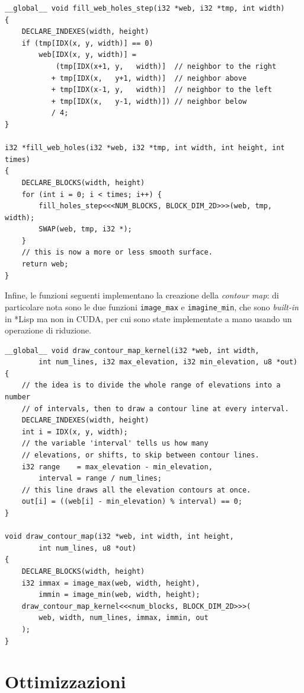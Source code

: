 \documentclass[12pt,a4paper,openright,twoside]{report}
\begin{document}
\begin{lstlisting}[style=mystyle]
__global__ void fill_web_holes_step(i32 *web, i32 *tmp, int width)
{
    DECLARE_INDEXES(width, height)
    if (tmp[IDX(x, y, width)] == 0)
        web[IDX(x, y, width)] =
            (tmp[IDX(x+1, y,   width)]  // neighbor to the right
           + tmp[IDX(x,   y+1, width)]  // neighbor above
           + tmp[IDX(x-1, y,   width)]  // neighbor to the left
           + tmp[IDX(x,   y-1, width)]) // neighbor below
           / 4;
}

i32 *fill_web_holes(i32 *web, i32 *tmp, int width, int height, int times)
{
    DECLARE_BLOCKS(width, height)
    for (int i = 0; i < times; i++) {
        fill_holes_step<<<NUM_BLOCKS, BLOCK_DIM_2D>>>(web, tmp, width);
        SWAP(web, tmp, i32 *);
    }
    // this is now a more or less smooth surface.
    return web;
}
\end{lstlisting}

Infine, le funzioni seguenti implementano la creazione della \textit{contour map}: di particolare nota sono le due funzioni \verb|image_max| e \verb|imagine_min|, che sono \textit{built-in} in *Lisp ma non in CUDA, per cui sono state implementate a mano usando un operazione di riduzione.

\begin{lstlisting}[style=mystyle]
__global__ void draw_contour_map_kernel(i32 *web, int width,
        int num_lines, i32 max_elevation, i32 min_elevation, u8 *out)
{
    // the idea is to divide the whole range of elevations into a number
    // of intervals, then to draw a contour line at every interval.
    DECLARE_INDEXES(width, height)
    int i = IDX(x, y, width);
    // the variable 'interval' tells us how many
    // elevations, or shifts, to skip between contour lines.
    i32 range    = max_elevation - min_elevation,
        interval = range / num_lines;
    // this line draws all the elevation contours at once.
    out[i] = ((web[i] - min_elevation) % interval) == 0;
}

void draw_contour_map(i32 *web, int width, int height,
        int num_lines, u8 *out)
{
    DECLARE_BLOCKS(width, height)
    i32 immax = image_max(web, width, height),
        immin = image_min(web, width, height);
    draw_contour_map_kernel<<<num_blocks, BLOCK_DIM_2D>>>(
        web, width, num_lines, immax, immin, out
    );
}
\end{lstlisting}

\section{Ottimizzazioni}
\end{document}
